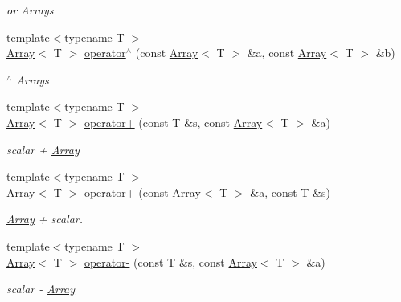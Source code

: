 \begin{DoxyCompactItemize}
\begin{DoxyCompactList}\small\item\em or Arrays \end{DoxyCompactList}\item 
{\footnotesize template$<$typename T $>$ }\\\mbox{\hyperlink{classXMLArray_1_1Array}{Array}}$<$ T $>$ \mbox{\hyperlink{namespaceXMLArray_a2aca927799841b80136c3d48bc8d3e29}{operator$^\wedge$}} (const \mbox{\hyperlink{classXMLArray_1_1Array}{Array}}$<$ T $>$ \&a, const \mbox{\hyperlink{classXMLArray_1_1Array}{Array}}$<$ T $>$ \&b)
\begin{DoxyCompactList}\small\item\em $^\wedge$ Arrays \end{DoxyCompactList}\item 
{\footnotesize template$<$typename T $>$ }\\\mbox{\hyperlink{classXMLArray_1_1Array}{Array}}$<$ T $>$ \mbox{\hyperlink{namespaceXMLArray_a39a31427301b9eee1d81eafe77f67c47}{operator+}} (const T \&s, const \mbox{\hyperlink{classXMLArray_1_1Array}{Array}}$<$ T $>$ \&a)
\begin{DoxyCompactList}\small\item\em scalar + \mbox{\hyperlink{classXMLArray_1_1Array}{Array}} \end{DoxyCompactList}\item 
{\footnotesize template$<$typename T $>$ }\\\mbox{\hyperlink{classXMLArray_1_1Array}{Array}}$<$ T $>$ \mbox{\hyperlink{namespaceXMLArray_a1276f5294299ad880d814c929988bf93}{operator+}} (const \mbox{\hyperlink{classXMLArray_1_1Array}{Array}}$<$ T $>$ \&a, const T \&s)
\begin{DoxyCompactList}\small\item\em \mbox{\hyperlink{classXMLArray_1_1Array}{Array}} + scalar. \end{DoxyCompactList}\item 
{\footnotesize template$<$typename T $>$ }\\\mbox{\hyperlink{classXMLArray_1_1Array}{Array}}$<$ T $>$ \mbox{\hyperlink{namespaceXMLArray_af485f313cac886a054ed3ca2f9507cab}{operator-\/}} (const T \&s, const \mbox{\hyperlink{classXMLArray_1_1Array}{Array}}$<$ T $>$ \&a)
\begin{DoxyCompactList}\small\item\em scalar -\/ \mbox{\hyperlink{classXMLArray_1_1Array}{Array}} \end{DoxyCompactList}\item 

\end{DoxyCompactItemize}
